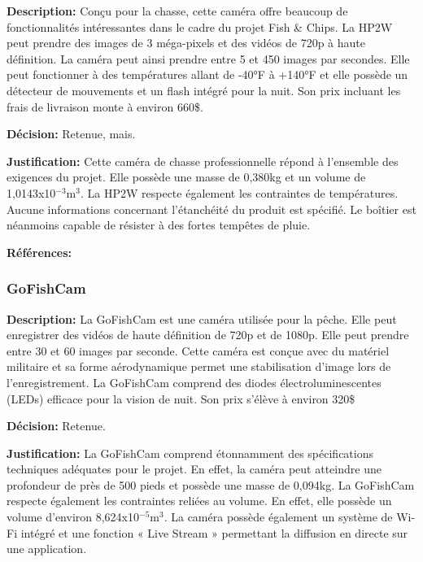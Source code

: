 \textbf{Description:} Conçu pour la chasse, cette caméra offre beaucoup de fonctionnalités intéressantes dans le cadre du projet Fish \& Chips. La HP2W peut prendre des images de 3 méga-pixels et des vidéos de 720p à haute définition. La caméra peut ainsi prendre entre 5 et 450 images par secondes. Elle peut fonctionner à des températures allant de -40°F à +140°F et elle possède un détecteur de mouvements et un flash intégré pour la nuit. Son prix incluant les frais de livraison monte à environ 660\$. \vspace{5mm}

\textbf{Décision:} Retenue, mais. \vspace{5mm}

\textbf{Justification:} Cette caméra de chasse professionnelle répond à l'ensemble des exigences du projet. Elle possède une masse de 0,380kg et un volume de 1,0143x10$^{-3}$m$^3$. La HP2W respecte également les contraintes de températures. Aucune informations concernant l'étanchéité du produit est spécifié. Le boîtier est néanmoins capable de résister à des fortes tempêtes de pluie. \vspace{5mm}

\textbf{Références:} \cite{HP2W}


\subsubsection{GoFishCam}

\textbf{Description:} La GoFishCam est une caméra utilisée pour la pêche. Elle peut enregistrer des vidéos de haute définition de 720p et de 1080p. Elle peut prendre entre 30 et 60 images par seconde. Cette caméra est conçue avec du matériel militaire et sa forme aérodynamique permet une stabilisation d'image lors de l'enregistrement. La GoFishCam comprend des diodes électroluminescentes (LEDs) efficace pour la vision de nuit. Son prix s'élève à environ 320\$ \vspace{5mm}

\textbf{Décision:} Retenue. \vspace{5mm}

\textbf{Justification:} La GoFishCam comprend étonnamment des spécifications techniques adéquates pour le projet. En effet, la caméra peut atteindre une profondeur de près de 500 pieds et possède une masse de 0,094kg. La GoFishCam respecte également les contraintes reliées au volume. En effet, elle possède un volume d'environ 8,624x10$^{-5}$m$^3$. La caméra possède également un système de Wi-Fi intégré et une fonction « Live Stream » permettant la diffusion en directe sur une application. \vspace{5mm}

